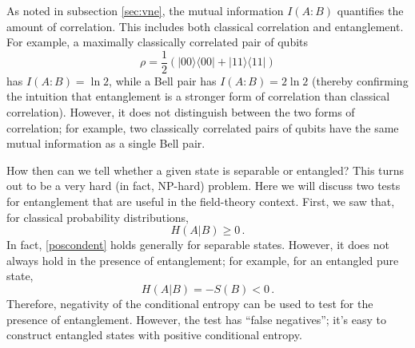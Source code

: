 \documentclass[11pt]{article}
\newcommand{\ket}[1]{|{#1}\rangle}
\newcommand{\bra}[1]{\langle{#1}|}
\begin{document}
As noted in subsection \ref{sec:vne}, the mutual information $I(A:B)$ quantifies the amount of correlation. This includes both classical correlation and entanglement. For example, a maximally classically correlated pair of qubits
\begin{equation}\label{correlated}
\rho = \frac12\left(\ket{00}\bra{00}+\ket{11}\bra{11}\right)
\end{equation}
has $I(A:B)=\ln2$, while a Bell pair has $I(A:B)=2\ln 2$ (thereby confirming the intuition that entanglement is a stronger form of correlation than classical correlation). However, it does not distinguish between the two forms of correlation; for example, two classically correlated pairs of qubits have the same mutual information as a single Bell pair.

How then can we tell whether a given state is separable or entangled? This turns out to be a very hard (in fact, NP-hard) problem. Here we will discuss two tests for entanglement that are useful in the field-theory context. First, we saw that, for classical probability distributions,
\begin{equation}\label{poscondent}
H(A|B)\ge0\,.
\end{equation}
In fact, \eqref{poscondent} holds generally for separable states. However, it does not always hold in the presence of entanglement; for example, for an entangled pure state,
\begin{equation}
H(A|B) = -S(B)<0\,.
\end{equation}
Therefore, negativity of the conditional entropy can be used to test for the presence of entanglement. However, the test has ``false negatives''; it's easy to construct entangled states with positive conditional entropy. 
\end{document}
